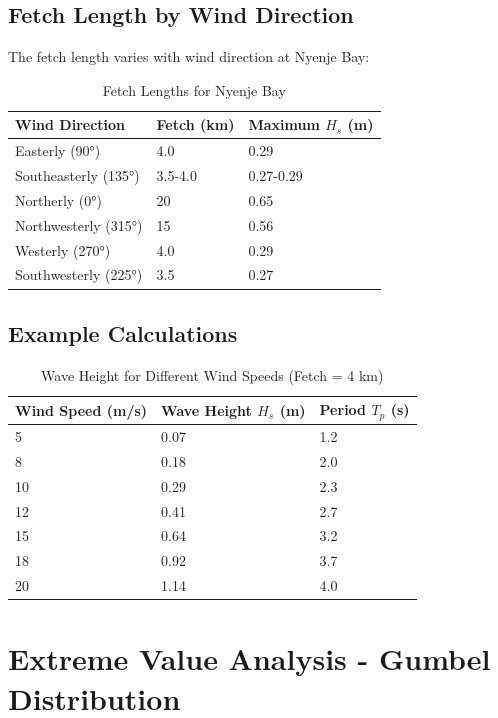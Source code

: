 \documentclass[12pt]{article}
\begin{document}
\subsection{Fetch Length by Wind Direction}

The fetch length varies with wind direction at Nyenje Bay:

\begin{table}[H]
\centering
\caption{Fetch Lengths for Nyenje Bay}
\begin{tabular}{|l|l|l|}
\hline
\textbf{Wind Direction} & \textbf{Fetch (km)} & \textbf{Maximum } $H_s$ \textbf{ (m)} \\
\hline
Easterly (90°) & 4.0 & 0.29 \\
Southeasterly (135°) & 3.5-4.0 & 0.27-0.29 \\
Northerly (0°) & 20 & 0.65 \\
Northwesterly (315°) & 15 & 0.56 \\
Westerly (270°) & 4.0 & 0.29 \\
Southwesterly (225°) & 3.5 & 0.27 \\
\hline
\end{tabular}
\end{table}

\subsection{Example Calculations}

\begin{table}[H]
\centering
\caption{Wave Height for Different Wind Speeds (Fetch = 4 km)}
\begin{tabular}{|l|l|l|}
\hline
\textbf{Wind Speed (m/s)} & \textbf{Wave Height } $H_s$ \textbf{ (m)} & \textbf{Period } $T_p$ \textbf{ (s)} \\
\hline
5 & 0.07 & 1.2 \\
8 & 0.18 & 2.0 \\
10 & 0.29 & 2.3 \\
12 & 0.41 & 2.7 \\
15 & 0.64 & 3.2 \\
18 & 0.92 & 3.7 \\
20 & 1.14 & 4.0 \\
\hline
\end{tabular}
\end{table}

\newpage

\section{Extreme Value Analysis - Gumbel Distribution}
\end{document}
